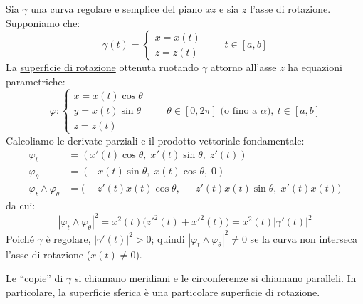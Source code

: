 \begin{esercizio}
Sia $\gamma$ una curva regolare e semplice del piano $xz$ e sia $z$ l'asse di rotazione. Supponiamo che:
\[
\gamma(t) = \begin{cases}
x = x(t) \\
z = z(t)
\end{cases}
\qquad t \in [a, b]
\]
La \underline{superficie di rotazione} ottenuta ruotando $\gamma$ attorno all'asse $z$ ha equazioni parametriche:
\[
\varphi : \begin{cases}
x = x(t)\cos\theta \\
y = x(t)\sin\theta \\
z = z(t)
\end{cases}
\qquad \theta \in [0, 2\pi] \text{ (o fino a } \alpha\text{)}, \ t \in [a, b]
\]
Calcoliamo le derivate parziali e il prodotto vettoriale fondamentale:
\begin{align*}
\varphi_t &= (x'(t)\cos\theta,\; x'(t)\sin\theta,\; z'(t)) \\
\varphi_\theta &= (-x(t)\sin\theta,\; x(t)\cos\theta,\; 0) \\
\varphi_t \wedge \varphi_\theta &= \big(-z'(t)x(t)\cos\theta,\; -z'(t)x(t)\sin\theta,\; x'(t)x(t)\big)
\end{align*}
da cui:
\[
|\varphi_t \wedge \varphi_\theta|^2 = x^2(t)\big(z'^2(t) + x'^2(t)\big) = x^2(t)|\gamma'(t)|^2
\]
Poiché $\gamma$ è regolare, $|\gamma'(t)|^2 > 0$; quindi $|\varphi_t \wedge \varphi_\theta|^2 \neq 0$ se la curva non interseca l'asse di rotazione ($x(t) \neq 0$).


\begin{center}
\end{center}

Le ``copie'' di $\gamma$ si chiamano \underline{meridiani} e le circonferenze si chiamano \underline{paralleli}. In particolare, la superficie sferica è una particolare superficie di rotazione.
\end{esercizio}

